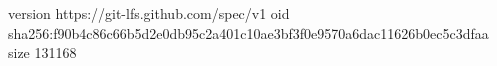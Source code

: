 version https://git-lfs.github.com/spec/v1
oid sha256:f90b4c86c66b5d2e0db95c2a401c10ae3bf3f0e9570a6dac11626b0ec5c3dfaa
size 131168
